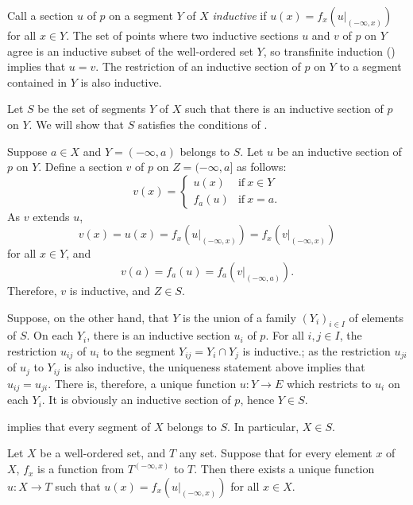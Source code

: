 \documentclass{article}
\begin{document}
Call a section \(u\) of \(p\) on a segment \(Y\) of \(X\)
\emph{inductive} if \(u(x) = f_x(u \vert_{(-\infty, x)})\) for all
\(x \in Y\).  The set of points where two inductive sections \(u\) and
\(v\) of \(p\) on \(Y\) agree is an inductive subset of the
well-ordered set \(Y\), so transfinite induction ()
implies that \(u = v\).  The restriction of an inductive section of
\(p\) on \(Y\) to a segment contained in \(Y\) is also inductive.

Let \(S\) be the set of segments \(Y\) of \(X\) such that there is an
inductive section of \(p\) on \(Y\).  We will show that \(S\)
satisfies the conditions of .

Suppose \(a \in X\) and \(Y = (-\infty, a)\) belongs to \(S\).  Let
\(u\) be an inductive section of \(p\) on \(Y\).  Define a section
\(v\) of \(p\) on \(Z = (-\infty, a]\) as follows:
\begin{displaymath}
  v(x) =
  \begin{cases}
    u(x) & \text{if} ~ x \in Y \\
    f_a(u) & \text{if} ~ x = a.
  \end{cases}
\end{displaymath}
As \(v\) extends \(u\),
\begin{displaymath}
  v(x) = u(x) = f_x(u \vert_{(-\infty, x)}) =
  f_x(v \vert_{(-\infty, x)})
\end{displaymath}
for all \(x \in Y\), and
\begin{displaymath}
  v(a) = f_a(u) = f_a(v \vert_{(-\infty, a)}).
\end{displaymath}
Therefore, \(v\) is inductive, and \(Z \in S\).

Suppose, on the other hand, that \(Y\) is the union of a family
\((Y_i)_{i \in I}\) of elements of \(S\).  On each \(Y_i\), there is
an inductive section \(u_i\) of \(p\).  For all \(i, j \in I\), the
restriction \(u_{ij}\) of \(u_i\) to the segment
\(Y_{ij} = Y_i \cap Y_j\) is inductive.; as the restriction \(u_{ji}\)
of \(u_j\) to \(Y_{ij}\) is also inductive, the uniqueness statement
above implies that \(u_{ij} = u_{ji}\).  There is, therefore, a unique
function \(u : Y \to E\) which restricts to \(u_i\) on each \(Y_i\).
It is obviously an inductive section of \(p\), hence \(Y \in S\).

 implies that every segment of \(X\) belongs to
\(S\).  In particular, \(X \in S\).

\begin{theorem}
  \label{thm:5kg5ewo1}
  Let \(X\) be a well-ordered set, and \(T\) any set.  Suppose that
  for every element \(x\) of \(X\), \(f_x\) is a function from
  \(T^{(-\infty, x)}\) to \(T\).  Then there exists a unique function
  \(u : X \to T\) such that \(u(x) = f_x(u \vert_{(-\infty, x)})\) for
  all \(x \in X\).
\end{theorem}
\end{document}
